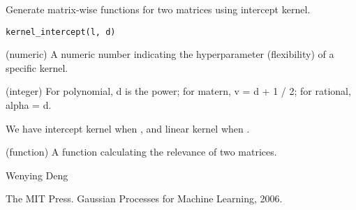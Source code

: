 \documentclass[a4paper]{book}
\begin{document}
%
\begin{Examples}
\end{Examples}
%
\begin{Description}\relax
Generate matrix-wise functions for two matrices using intercept kernel.
\end{Description}
%
\begin{Usage}
\begin{verbatim}
kernel_intercept(l, d)
\end{verbatim}
\end{Usage}
%
\begin{Arguments}
\begin{ldescription}
\item[\code{l}] (numeric) A numeric number indicating the hyperparameter
(flexibility) of a specific kernel.

\item[\code{d}] (integer) For polynomial, d is the power; for matern, v = d + 1 /
2; for rational, alpha = d.
\end{ldescription}
\end{Arguments}
%
\begin{Details}\relax
{}  We have intercept
kernel when , and linear kernel when .
\end{Details}
%
\begin{Value}
\begin{ldescription}
\item[\code{matrix\_wise}] (function) A function calculating the relevance
of two matrices.
\end{ldescription}
\end{Value}
%
\begin{Author}\relax
Wenying Deng
\end{Author}
%
\begin{References}\relax
The MIT Press. Gaussian Processes for Machine Learning, 2006.
\end{References}
\end{document}
